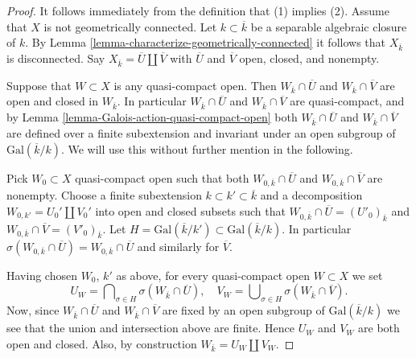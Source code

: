 \begin{proof}
It follows immediately from the definition that (1) implies (2).
Assume that $X$ is not geometrically connected.
Let $k \subset \overline{k}$ be a separable algebraic
closure of $k$. By
Lemma \ref{lemma-characterize-geometrically-connected}
it follows that $X_{\overline{k}}$ is disconnected.
Say $X_{\overline{k}} = \overline{U} \amalg \overline{V}$
with $\overline{U}$ and $\overline{V}$ open, closed, and nonempty.

\medskip\noindent
Suppose that $W \subset X$ is any quasi-compact open.
Then $W_{\overline{k}} \cap \overline{U}$ and
$W_{\overline{k}} \cap \overline{V}$ are open and closed in
$W_{\overline{k}}$. In particular $W_{\overline{k}} \cap \overline{U}$ and
$W_{\overline{k}} \cap \overline{V}$ are quasi-compact, and by
Lemma \ref{lemma-Galois-action-quasi-compact-open}
both $W_{\overline{k}} \cap \overline{U}$ and
$W_{\overline{k}} \cap \overline{V}$
are defined over a finite subextension and invariant under an
open subgroup of $\text{Gal}(\overline{k}/k)$.
We will use this without further mention in the following.

\medskip\noindent
Pick $W_0 \subset X$ quasi-compact open such that both
$W_{0, \overline{k}} \cap \overline{U}$ and
$W_{0, \overline{k}} \cap \overline{V}$ are nonempty.
Choose a finite subextension $k \subset k' \subset \overline{k}$
and a decomposition $W_{0, k'} = U_0' \amalg V_0'$ into open and closed
subsets such that
$W_{0, \overline{k}} \cap \overline{U} = (U'_0)_{\overline{k}}$ and
$W_{0, \overline{k}} \cap \overline{V} = (V'_0)_{\overline{k}}$.
Let $H = \text{Gal}(\overline{k}/k') \subset \text{Gal}(\overline{k}/k)$.
In particular
$\sigma(W_{0, \overline{k}} \cap \overline{U}) =
W_{0, \overline{k}} \cap \overline{U}$ and similarly for
$\overline{V}$.

\medskip\noindent
Having chosen $W_0$, $k'$ as above, for every quasi-compact open
$W \subset X$ we set
$$
U_W =
\bigcap\nolimits_{\sigma \in H} \sigma(W_{\overline{k}} \cap \overline{U}),
\quad
V_W =
\bigcup\nolimits_{\sigma \in H} \sigma(W_{\overline{k}} \cap \overline{V}).
$$
Now, since $W_{\overline{k}} \cap \overline{U}$ and
$W_{\overline{k}} \cap \overline{V}$ are fixed by an open subgroup of
$\text{Gal}(\overline{k}/k)$ we see that the union and intersection
above are finite. Hence $U_W$ and $V_W$ are both open and closed.
Also, by construction $W_{\bar k} = U_W \amalg V_W$.


\end{proof}
